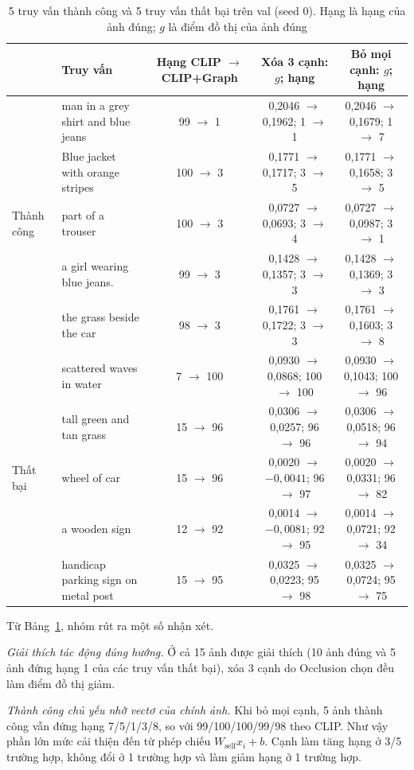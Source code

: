 \begin{table}[t]
\centering
\caption{5 truy vấn thành công và 5 truy vấn thất bại trên val (seed 0). Hạng là hạng của ảnh đúng; $g$ là điểm đồ thị của ảnh đúng}
\label{tab:case}
\footnotesize
\begin{tabular}{@{}l l c c c@{}}
\toprule
& \textbf{Truy vấn} & \textbf{Hạng CLIP $\to$ CLIP+Graph} & \textbf{Xóa 3 cạnh: $g$; hạng} & \textbf{Bỏ mọi cạnh: $g$; hạng} \\
\midrule
\multirow{5}{*}{Thành công}
& man in a grey shirt and blue jeans & 99 $\to$ 1 & 0,2046 $\to$ 0,1962; 1 $\to$ 1 & 0,2046 $\to$ 0,1679; 1 $\to$ 7 \\
& Blue jacket with orange stripes & 100 $\to$ 3 & 0,1771 $\to$ 0,1717; 3 $\to$ 5 & 0,1771 $\to$ 0,1658; 3 $\to$ 5 \\
& part of a trouser & 100 $\to$ 3 & 0,0727 $\to$ 0,0693; 3 $\to$ 4 & 0,0727 $\to$ 0,0987; 3 $\to$ 1 \\
& a girl wearing blue jeans. & 99 $\to$ 3 & 0,1428 $\to$ 0,1357; 3 $\to$ 3 & 0,1428 $\to$ 0,1369; 3 $\to$ 3 \\
& the grass beside the car & 98 $\to$ 3 & 0,1761 $\to$ 0,1722; 3 $\to$ 3 & 0,1761 $\to$ 0,1603; 3 $\to$ 8 \\
\midrule
\multirow{5}{*}{Thất bại}
& scattered waves in water & 7 $\to$ 100 & 0,0930 $\to$ 0,0868; 100 $\to$ 100 & 0,0930 $\to$ 0,1043; 100 $\to$ 96 \\
& tall green and tan grass & 15 $\to$ 96 & 0,0306 $\to$ 0,0257; 96 $\to$ 96 & 0,0306 $\to$ 0,0518; 96 $\to$ 94 \\
& wheel of car & 15 $\to$ 96 & 0,0020 $\to$ $-0,0041$; 96 $\to$ 97 & 0,0020 $\to$ 0,0331; 96 $\to$ 82 \\
& a wooden sign & 12 $\to$ 92 & 0,0014 $\to$ $-0,0081$; 92 $\to$ 95 & 0,0014 $\to$ 0,0721; 92 $\to$ 34 \\
& handicap parking sign on metal post & 15 $\to$ 95 & 0,0325 $\to$ 0,0223; 95 $\to$ 98 & 0,0325 $\to$ 0,0724; 95 $\to$ 75 \\
\bottomrule
\end{tabular}
\end{table}

Từ Bảng~\ref{tab:case}, nhóm rút ra một số nhận xét.

\textit{Giải thích tác động đúng hướng.} Ở cả 15 ảnh được giải thích (10 ảnh đúng và 5 ảnh đứng hạng 1 của các truy vấn thất bại), xóa 3 cạnh do Occlusion chọn đều làm điểm đồ thị giảm.

\textit{Thành công chủ yếu nhờ vectơ của chính ảnh.} Khi bỏ mọi cạnh, 5 ảnh thành công vẫn đứng hạng 7/5/1/3/8, so với 99/100/100/99/98 theo CLIP. Như vậy phần lớn mức cải thiện đến từ phép chiếu $W_{\text{self}}x_i + b$. Cạnh làm tăng hạng ở 3/5 trường hợp, không đổi ở 1 trường hợp và làm giảm hạng ở 1 trường hợp.

